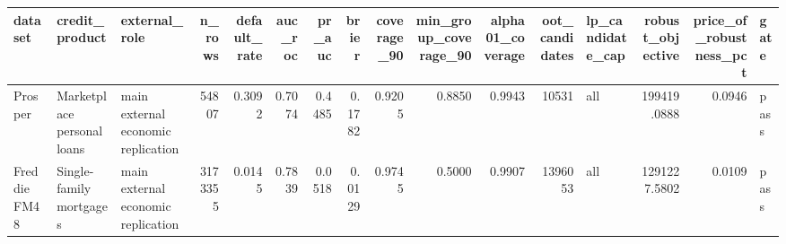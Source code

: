 \begin{tabular}{lllrrrrrrrrrlrrl}
\toprule
dataset & credit\_product & external\_role & n\_rows & default\_rate & auc\_roc & pr\_auc & brier & coverage\_90 & min\_group\_coverage\_90 & alpha01\_coverage & oot\_candidates & lp\_candidate\_cap & robust\_objective & price\_of\_robustness\_pct & gate \\
\midrule
Prosper & Marketplace personal loans & main external economic replication & 54807 & 0.3092 & 0.7074 & 0.4485 & 0.1782 & 0.9205 & 0.8850 & 0.9943 & 10531 & all & 199419.0888 & 0.0946 & pass \\
Freddie FM48 & Single-family mortgages & main external economic replication & 3173355 & 0.0145 & 0.7839 & 0.0518 & 0.0129 & 0.9745 & 0.5000 & 0.9907 & 1396053 & all & 1291227.5802 & 0.0109 & pass \\
\bottomrule
\end{tabular}
